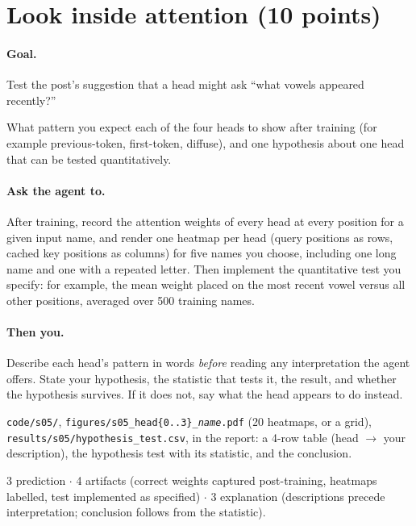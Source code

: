 \documentclass[11pt,letterpaper]{article}
\newcommand{\agent}[1]{\paragraph{Ask the agent to.} #1}
\newcommand{\you}[1]{\paragraph{Then you.} #1}
\newcommand{\goal}[1]{\paragraph{Goal.} #1}
\begin{document}
\section{Look inside attention \hfill (10 points)}
\goal{Test the post's suggestion that a head might ask ``what vowels appeared recently?''}
\begin{predict}
What pattern you expect each of the four heads to show after training (for example previous-token, first-token, diffuse), and one hypothesis about one head that can be tested quantitatively.
\end{predict}
\agent{After training, record the attention weights of every head at every position for a given input name, and render one heatmap per head (query positions as rows, cached key positions as columns) for five names you choose, including one long name and one with a repeated letter. Then implement the quantitative test you specify: for example, the mean weight placed on the most recent vowel versus all other positions, averaged over 500 training names.}
\you{Describe each head's pattern in words \emph{before} reading any interpretation the agent offers. State your hypothesis, the statistic that tests it, the result, and whether the hypothesis survives. If it does not, say what the head appears to do instead.}
\begin{deliver}
\texttt{code/s05/}, \texttt{figures/s05\_head\{0..3\}\_\textit{name}.pdf} (20 heatmaps, or a grid), \texttt{results/s05/hypothesis\_test.csv}, in the report: a 4-row table (head $\to$ your description), the hypothesis test with its statistic, and the conclusion.
\end{deliver}
\begin{rubric}3 prediction $\cdot$ 4 artifacts (correct weights captured post-training, heatmaps labelled, test implemented as specified) $\cdot$ 3 explanation (descriptions precede interpretation; conclusion follows from the statistic).\end{rubric}

\end{document}
